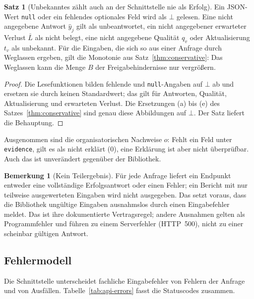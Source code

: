 \documentclass[a4paper,12pt]{article}
\theoremstyle{definition}
\newtheorem{bemerkung}[definition]{Bemerkung}
\newtheorem{satz}[definition]{Satz}
\begin{document}
\begin{satz}[Unbekanntes zählt auch an der Schnittstelle nie als Erfolg]\label{thm:api-conservative}
Ein JSON-Wert \texttt{null} oder ein fehlendes optionales Feld wird als $\bot$ gelesen. Eine nicht angegebene Antwort $\hat y_j$ gilt als unbeantwortet, ein nicht angegebener erwarteter Verlust $\bar L$ als nicht belegt, eine nicht angegebene Qualität $q_v$ oder Aktualisierung $t_v$ als unbekannt. Für die Eingaben, die sich so aus einer Anfrage durch Weglassen ergeben, gilt die Monotonie aus Satz~\ref{thm:conservative}: Das Weglassen kann die Menge $B$ der Freigabehindernisse nur vergrößern.
\end{satz}
\begin{proof}
Die Lesefunktionen bilden fehlende und \texttt{null}-Angaben auf $\bot$ ab und ersetzen sie durch keinen Standardwert; das gilt für Antworten, Qualität, Aktualisierung und erwarteten Verlust. Die Ersetzungen (a) bis (e) des Satzes~\ref{thm:conservative} sind genau diese Abbildungen auf $\bot$. Der Satz liefert die Behauptung.
\end{proof}

Ausgenommen sind die organisatorischen Nachweise $o$: Fehlt ein Feld unter \texttt{evidence}, gilt es als nicht erklärt ($0$), eine Erklärung ist aber nicht überprüfbar. Auch das ist unverändert gegenüber der Bibliothek.

\begin{bemerkung}[Kein Teilergebnis]
Für jede Anfrage liefert ein Endpunkt entweder eine vollständige Erfolgsantwort oder einen Fehler; ein Bericht mit nur teilweise ausgewerteten Eingaben wird nicht ausgegeben. Das setzt voraus, dass die Bibliothek ungültige Eingaben ausnahmslos durch einen Eingabefehler meldet. Das ist ihre dokumentierte Vertragsregel; andere Ausnahmen gelten als Programmfehler und führen zu einem Serverfehler (HTTP~500), nicht zu einer scheinbar gültigen Antwort.
\end{bemerkung}

\subsection{Fehlermodell}
\label{sec:api-errors}
Die Schnittstelle unterscheidet fachliche Eingabefehler von Fehlern der Anfrage und von Ausfällen. Tabelle~\ref{tab:api-errors} fasst die Statuscodes zusammen.
\end{document}
